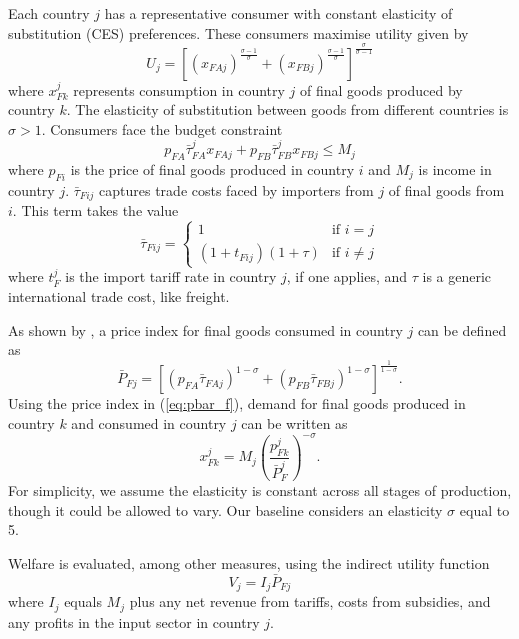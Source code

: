 \documentclass{article}
\begin{document}
Each country $j$ has a representative consumer with constant elasticity of substitution (CES) preferences. These consumers maximise utility given by
\begin{equation}
    U_j = \left[ (x_{FAj})^{\frac{\sigma - 1}{\sigma}} + (x_{FBj})^{\frac{\sigma - 1}{\sigma}} \right]^{\frac{\sigma}{\sigma - 1}}
\end{equation}
where $x_{Fk}^j$ represents consumption in country $j$ of final goods produced by country $k$. The elasticity of substitution between goods from different countries is $\sigma > 1$. Consumers face the budget constraint 
\begin{equation}
    p_{FA} \bar{\tau}^{j}_{FA} x_{FAj} + p_{FB} \bar{\tau}^{j}_{FB} x_{FBj} \leq M_j
\end{equation}
where $p_{Fi}$ is the price of final goods produced in country $i$ and $M_j$ is income in country $j$. $\bar{\tau}_{Fij}$ captures trade costs faced by importers from $j$ of final goods from $i$. This term takes the value 
\begin{equation} \label{eq:tau}
    \bar{\tau}_{Fij} =
    \begin{cases}
        1 &\text{if } i = j \\
        (1 + t_{Fij})(1 + \tau) &\text{if } i \neq j
    \end{cases}
\end{equation}
where $t^j_{F}$ is the import tariff rate in country $j$, if one applies, and $\tau$ is a generic international trade cost, like freight. 

As shown by \textcite{dixit_monopolistic_1977}, a price index for final goods consumed in country $j$ can be defined as
\begin{equation} \label{eq:pbar_f}
      \bar{P}_{Fj} = \left[ (p_{FA} \bar{\tau}_{FAj} )^{1-\sigma} +  (p_{FB} \bar{\tau}_{FBj})^{1-\sigma} \right]^\frac{1}{1-\sigma} .
\end{equation}
Using the price index in (\ref{eq:pbar_f}), demand for final goods produced in country $k$ and consumed in country $j$ can be written as
\begin{equation}
    x_{Fk}^{j} = M_j \left( \frac{p_{Fk}^{j}}{\bar{P}_F^{j}} \right)^{-\sigma}  .
\end{equation}
For simplicity, we assume the elasticity is constant across all stages of production, though it could be allowed to vary. Our baseline considers an elasticity $\sigma$ equal to 5.

Welfare is evaluated, among other measures, using the indirect utility function
\begin{equation}
    V_j = I_j \bar{P}_{Fj}
\end{equation}
where $I_j$ equals $M_j$ plus any net revenue from tariffs, costs from subsidies, and any profits in the input sector in country $j$.
\end{document}
